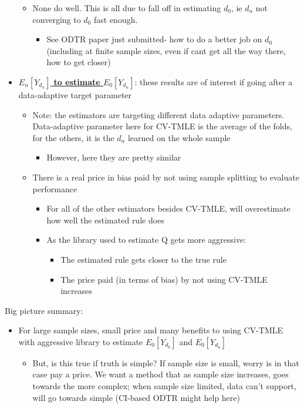 \documentclass[11pt]{article}\usepackage[]{graphicx}\usepackage[]{color}
\begin{document}
\begin{itemize}
    \begin{itemize}
        \item None do well. This is all due to fall off in estimating $d_0$, ie $d_n$ not converging to $d_0$ fast enough.
        \begin{itemize}
            \item See ODTR paper just submitted- how to do a better job on $d_0$ (including at finite sample sizes, even if cant get all the way there, how to get closer)
        \end{itemize}
    \end{itemize}
    \item \textbf{\underline{$E_n[Y_{d_n}]$ to estimate $E_0[Y_{d_n}]$}}: these results are of interest if going after a data-adaptive target parameter
    \begin{itemize}
        \item Note: the estimators are targeting different data adaptive parameters. Data-adaptive parameter here for CV-TMLE is the average of the folds, for the others, it is the $d_n$ learned on the whole sample
        \begin{itemize}
            \item However, here they are pretty similar
        \end{itemize}
        \item There is a real price in bias paid by not using sample splitting to evaluate performance
        \begin{itemize}
            \item For all of the other estimators besides CV-TMLE, will overestimate how well the estimated rule does
            \item As the library used to estimate Q gets more aggressive:
            \begin{itemize}
                \item The estimated rule gets closer to the true rule
                \item The price paid (in terms of bias) by not using CV-TMLE increases
            \end{itemize}
        \end{itemize}
    \end{itemize}
\end{itemize}


\noindent Big picture summary:
\begin{itemize}
    \item For large sample sizes, small price and many benefits to using CV-TMLE with aggressive library to estimate $E_0[Y_{d_0}]$ and $E_0[Y_{d_n}]$
    \begin{itemize}
        \item But, is this true if truth is simple? If sample size is small, worry is in that case pay a price. We want a method that as sample size increases, goes towards the more complex; when sample size limited, data can't support, will go towards simple (CI-based ODTR might help here)
    \end{itemize}
\end{itemize}
\end{document}
